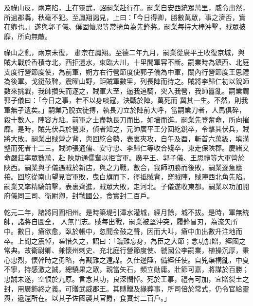 \begin{pinyinscope}
 及祿山反，兩京陷，上在靈武，詔嗣業赴行在。嗣業自安西統眾萬里，威令肅然，所過郡縣，秋毫不犯。至鳳翔謁見，上曰：「今日得卿，勝數萬眾，事之濟否，實在卿也。」遂與郭子儀、僕固懷恩等常犄角為先鋒將。嗣業每持大棒沖擊，賊眾披靡，所向無敵。



 祿山之亂，兩京未復，
 肅宗在鳳翔。至德二年九月，嗣業從廣平王收復京城，與賊大戰於香積寺北，西拒灃水，東臨大川，十里間軍容不斷。嗣業時為鎮西、北庭支度行營節度使，為前軍，朔方右行營節度使郭子儀為中軍，關內行營節度王思禮為後軍。戈鋌鼓鞞，震曜山野，距賊軍數里，列長陣而待之。賊將李歸仁初以銳師數來挑戰，我師攢矢而逐之，賊軍大至，逼我追騎，突入我營，我師囂亂。嗣業謂郭子儀曰：「今日之事，若不以身啖寇，決戰於陣，萬死而
 冀其一生。不然，則我軍無孑遺矣。」嗣業乃脫衣徒搏，執長刀立於陣前大呼，當嗣業刀者，人馬俱碎，殺十數人，陣容方駐。前軍之士盡執長刀而出，如墻而進。嗣業先登奮命，所向摧靡。是時，賊先伏兵於營東，偵者知之，元帥廣平王分回紇銳卒，令擊其伏兵，賊將大敗。嗣業出賊營之背，與回紇合勢，表裏夾攻，自午及酉，斬首六萬級，填溝壑而死者十二三。賊帥張通儒、安守忠、李歸仁等收合殘卒，東走保陜郡。慶緒又命嚴莊率眾數萬，赴
 陜助通儒輩以拒官軍。廣平王、郭子儀、王思禮等大軍營於陜西。嗣業與子儀遇賊於新店，與之力戰，數合，我師初勝而後敗，嗣業逐急應接。回紇從南山望見官軍敗，曳白旗而下，徑抵賊背，穿賊陣，賊陣西北角先陷。嗣業又率精騎前擊，表裏齊進，賊眾大敗，走河北。子儀遂收東都。嗣業以功加開府儀同三司、衛尉卿，封虢國公，食實封二百戶。



 乾元二年，諸將同圍相州。是時築堤引漳水灌城，經月餘，城不拔。是時，軍無統帥，諸將自圖全，
 人無鬥志。賊每出戰，嗣業被堅沖突，履鋒冒刃，為流矢所中。數日，瘡欲愈，臥於帳中，忽聞金鼓之聲，因而大叫，瘡中血出數升注地而卒。上聞之震悼，嗟惜久之，詔曰：「臨難忘身，為臣之大節；念功加贈，經國之常典。故衛尉卿、兼懷州刺史、充北庭行營節度使、虢國公李嗣業，植操沉厚，秉心忠烈，懷幹時之勇略，有戡難之遠謀。久仕邊陲，備經任使。自兇渠構亂，中夏不寧，持感激之誠，總驍果之眾，親當矢石，頻立勛庸。壯節可嘉，將謀於百勝；
 忠誠未遂，空恨於九原。言念其功，良深憫悼。死於王事，禮有可加，宜贈裂土之封，用廣飾終之義。可贈武威郡王。其賻贈及緣葬事，所司倍於常式，仍令官給靈輿，遞還所在。以其子佐國襲其官爵，食實封二百戶。」




\end{pinyinscope}
